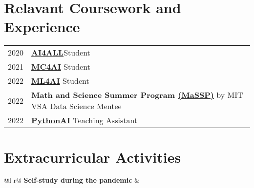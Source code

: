 \documentclass[a4paper,12pt]{article}
\begin{document}
\section{Relavant Coursework and Experience}


\begin{tabularx}{\linewidth}{@{}l X@{}}	

2020 & \href{https://i.imgur.com/XUBYdUB.png}{\textbf{AI4ALL}}\hfill Student\\ 
2021 & \href{https://i.imgur.com/XUBYdUB.png}{\textbf{MC4AI}} \hfill Student\\ 
2022 & \href{https://i.imgur.com/XUBYdUB.png}{\textbf{ML4AI}} \hfill Student\\ 
2022  & \textbf{Math and Science Summer Program \href{hhttps://www.facebook.com/masspvn}{(MaSSP)}} by MIT VSA  \hfill Data Science Mentee\\ 
2022  &  \href{https://i.imgur.com/XUBYdUB.png}{\textbf{PythonAI}} \hfill Teaching Assistant\\

\end{tabularx}


\section{Extracurricular Activities}

\begin{tabularx}{\linewidth}{ @{}l r@{} }
\textbf{Self-study during the pandemic} & \hfill \\[3.75pt]
\end{tabularx}
\end{document}
